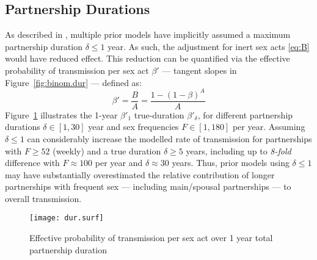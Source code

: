 \subsection{Partnership Durations}\label{foi.exp.dur}
As described in , multiple prior models have
implicitly assumed a maximum partnership duration $\delta \le 1$ year.
As such, the adjustment for inert sex acts \eqref{eq:B} would have reduced effect.
This reduction can be quantified via
the effective probability of transmission per sex act $\beta'$
--- \ie tangent slopes in Figure~\ref{fig:binom.dur} --- defined as:
\begin{equation}\label{eq:beta.eff}
  \beta' = \frac{B}{A} = \frac{1 - {(1 - \beta)}^{A}}{A}
\end{equation}
Figure~\ref{fig:dur.surf} illustrates
the 1-year $\beta'_1$ \vs true-duration $\beta'_\delta$, for different
partnership durations $\delta \in [1, 30]$ year and
sex frequencies $F \in [1,180]$ per year.
Assuming $\delta \le 1$ can considerably increase the modelled rate of transmission
for partnerships with $F \ge 52$ (\ie weekly) and a true duration $\delta \ge 5$ years,
including up to \emph{8-fold} difference with
$F \approx 100$ per year and $\delta \approx 30$ years.
Thus, prior models using $\delta \le 1$ may have
substantially overestimated the relative contribution of
longer partnerships with frequent sex --- including main/spousal partnerships ---
to overall transmission.
\begin{figure}
  \centering\texttt{[image: dur.surf]}
  \caption{Effective probability of transmission per sex act
    over 1 year \vs total partnership duration}
  \label{fig:dur.surf}
\end{figure}
